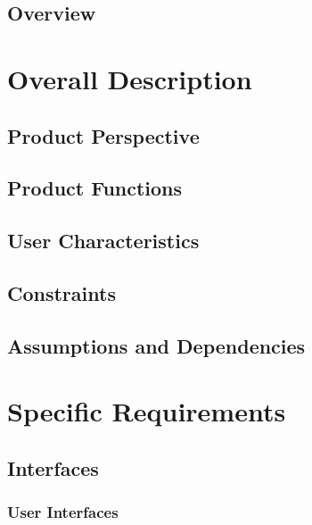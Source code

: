 \documentclass{scrreprt}
\begin{document}
\section{Overview}



\chapter{Overall Description}

\section{Product Perspective}



\section{Product Functions}



\section{User Characteristics}



\section{Constraints}



\section{Assumptions and Dependencies}



\chapter{Specific Requirements}

\section{Interfaces}


\subsection{User Interfaces}
\end{document}
